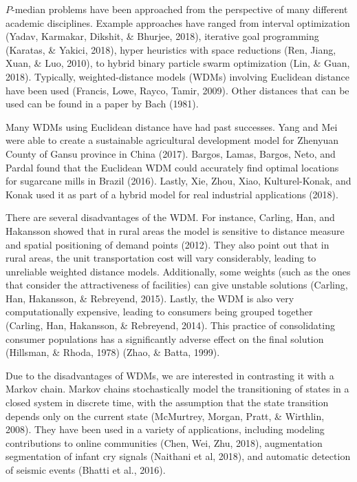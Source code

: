 \documentclass[twoside,twocolumn]{article}
\begin{document}
$P$-median problems have been approached from the perspective of many different academic disciplines.
Example approaches have ranged from interval optimization (Yadav, Karmakar, Dikshit, \& Bhurjee, 2018), iterative goal programming (Karatas, \& Yakici, 2018), hyper heuristics with space reductions (Ren, Jiang, Xuan, \& Luo, 2010), to hybrid binary particle swarm optimization (Lin, \& Guan, 2018).
Typically, weighted-distance models (WDMs) involving Euclidean distance have been used (Francis, Lowe, Rayco, Tamir, 2009).
Other distances that can be used can be found in a paper by Bach (1981).

Many WDMs using Euclidean distance have had past successes.
Yang and Mei were able to create a sustainable agricultural development model for Zhenyuan County of Gansu province in China (2017).
Bargos, Lamas, Bargos, Neto, and Pardal found that the Euclidean WDM could accurately find optimal locations for sugarcane mills in Brazil (2016).
Lastly, Xie, Zhou, Xiao, Kulturel-Konak, and Konak used it as part of a hybrid model for real industrial applications (2018).

There are several disadvantages of the WDM.
For instance, Carling, Han, and Hakansson showed that in rural areas the model is sensitive to distance measure and spatial positioning of demand points (2012).
They also point out that in rural areas, the unit transportation cost will vary considerably, leading to unreliable weighted distance models.
Additionally, some weights (such as the ones that consider the attractiveness of facilities) can give unstable solutions (Carling, Han, Hakansson, \& Rebreyend, 2015).
Lastly, the WDM is also very computationally expensive, leading to consumers being grouped together (Carling, Han, Hakansson, 
\& Rebreyend, 2014). 
This practice of consolidating consumer populations has a significantly adverse effect on the final solution (Hillsman, \& Rhoda, 1978) (Zhao, \& Batta, 1999).

Due to the disadvantages of WDMs, we are interested in contrasting it with a Markov chain.
Markov chains stochastically model the transitioning of states in a closed system in discrete time, with the assumption that the state transition depends only on the current state (McMurtrey, Morgan, Pratt, \& Wirthlin, 2008).
They have been used in a variety of applications, including modeling contributions to online communities (Chen, Wei, Zhu, 2018), augmentation segmentation of infant cry signals (Naithani et al, 2018), and automatic detection of seismic events (Bhatti et al., 2016).
\end{document}
